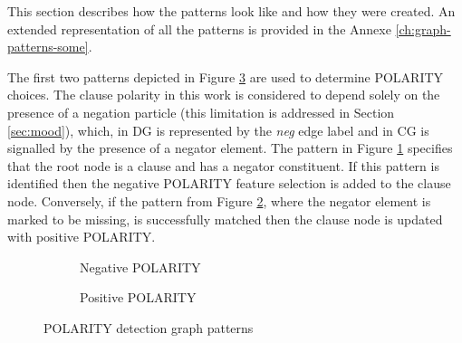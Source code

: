 This section describes how the patterns look like and how they were created. An extended representation of all the patterns is provided in the Annexe \ref{ch:graph-patterns-some}.

The first two patterns depicted in Figure \ref{fig:polarity-pattern7} are used to determine POLARITY choices. The clause polarity in this work is considered to depend solely on the presence of a negation particle (this limitation is addressed in Section \ref{sec:mood}), which, in DG is represented by the \textit{neg} edge label and in CG is signalled by the presence of a negator element. The pattern in Figure \ref{fig:neg-pattern5} specifies that the root node is a clause and has a negator constituent. If this pattern is identified then the negative POLARITY feature selection is added to the clause node. Conversely, if the pattern from Figure \ref{fig:neg-pattern6}, where the negator element is marked to be missing, is successfully matched then the clause node is updated with positive POLARITY.

    \begin{figure}[!ht]
        \centering
        \begin{subfigure}[t]{0.47\textwidth}
            \centering
            \caption{Negative POLARITY}
            \label{fig:neg-pattern5}
        \end{subfigure}
        \begin{subfigure}[t]{0.47\textwidth}
            \centering
            \caption{Positive POLARITY}
            \label{fig:neg-pattern6}
        \end{subfigure}
        \caption{POLARITY detection graph patterns}
        \label{fig:polarity-pattern7}
        \end{figure}


